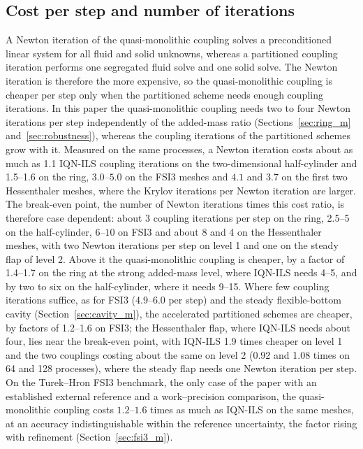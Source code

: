 \subsection{Cost per step and number of iterations}\label{sec:accuracy_cost_discussion}
A Newton iteration of the quasi-monolithic coupling solves a preconditioned linear system for all fluid and solid unknowns, whereas a partitioned coupling iteration performs one segregated fluid solve and one solid solve.
The Newton iteration is therefore the more expensive, so the quasi-monolithic coupling is cheaper per step only when the partitioned scheme needs enough coupling iterations.
In this paper the quasi-monolithic coupling needs two to four Newton iterations per step independently of the added-mass ratio (Sections~\ref{sec:ring_m} and~\ref{sec:robustness}), whereas the coupling iterations of the partitioned schemes grow with it.
Measured on the same processes, a Newton iteration costs about as much as 1.1 IQN-ILS coupling iterations on the two-dimensional half-cylinder and 1.5--1.6 on the ring, $3.0$--$5.0$ on the FSI3 meshes and $4.1$ and $3.7$ on the first two Hessenthaler meshes, where the Krylov iterations per Newton iteration are larger.
The break-even point, the number of Newton iterations times this cost ratio, is therefore case dependent: about 3 coupling iterations per step on the ring, 2.5--5 on the half-cylinder, $6$--$10$ on FSI3 and about 8 and 4 on the Hessenthaler meshes, with two Newton iterations per step on level 1 and one on the steady flap of level 2.
Above it the quasi-monolithic coupling is cheaper, by a factor of 1.4--1.7 on the ring at the strong added-mass level, where IQN-ILS needs 4--5, and by two to six on the half-cylinder, where it needs 9--15.
Where few coupling iterations suffice, as for FSI3 (4.9--6.0 per step) and the steady flexible-bottom cavity (Section~\ref{sec:cavity_m}), the accelerated partitioned schemes are cheaper, by factors of 1.2--1.6 on FSI3; the Hessenthaler flap, where IQN-ILS needs about four, lies near the break-even point, with IQN-ILS 1.9 times cheaper on level 1 and the two couplings costing about the same on level 2 (0.92 and 1.08 times on 64 and 128 processes), where the steady flap needs one Newton iteration per step.
On the Turek--Hron FSI3 benchmark, the only case of the paper with an established external reference and a work--precision comparison, the quasi-monolithic coupling costs $1.2$--$1.6$ times as much as IQN-ILS on the same meshes, at an accuracy indistinguishable within the reference uncertainty, the factor rising with refinement (Section~\ref{sec:fsi3_m}).
